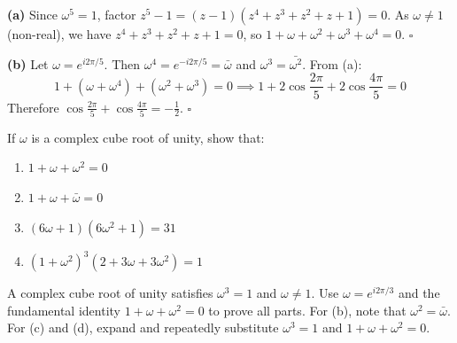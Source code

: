 \begin{solution}[Sketch]
\textbf{(a)} Since $\omega^5 = 1$, factor $z^5-1 = (z-1)(z^4+z^3+z^2+z+1)=0$. As $\omega \neq 1$ (non-real), we have $z^4+z^3+z^2+z+1=0$, so $1+\omega+\omega^2+\omega^3+\omega^4=0$. \quad $\square$

\textbf{(b)} Let $\omega = e^{i2\pi/5}$. Then $\omega^4 = e^{-i2\pi/5} = \bar{\omega}$ and $\omega^3 = \bar{\omega^2}$. From (a):
\[
1 + (\omega + \omega^4) + (\omega^2 + \omega^3) = 0 \implies 1 + 2\cos\frac{2\pi}{5} + 2\cos\frac{4\pi}{5} = 0
\]
Therefore $\cos\frac{2\pi}{5} + \cos\frac{4\pi}{5} = -\frac{1}{2}$. \quad $\square$
\end{solution}

\begin{problem}
If $\omega$ is a complex cube root of unity, show that:
\begin{enumerate}[label=\alph*),leftmargin=*]
    \item $1 + \omega + \omega^2 = 0$
    \item $1 + \omega + \bar{\omega} = 0$
    \item $(6\omega + 1)(6\omega^2 + 1) = 31$
    \item $(1 + \omega^2)^3 (2 + 3\omega + 3\omega^2) = 1$
\end{enumerate}
\end{problem}

\begin{hint}
A complex cube root of unity satisfies $\omega^3 = 1$ and $\omega \neq 1$. Use $\omega = e^{i2\pi/3}$ and the fundamental identity $1 + \omega + \omega^2 = 0$ to prove all parts. For (b), note that $\omega^2 = \bar{\omega}$. For (c) and (d), expand and repeatedly substitute $\omega^3 = 1$ and $1 + \omega + \omega^2 = 0$.
\end{hint}

